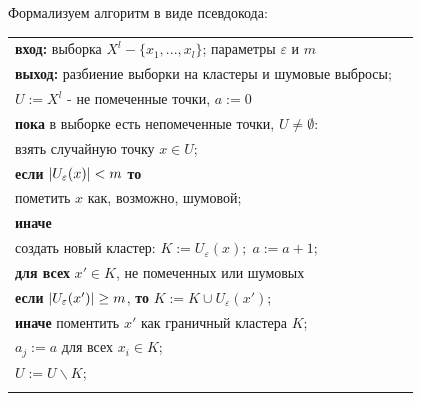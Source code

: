 Формализуем алгоритм в виде псевдокода:\\
\begin{tabularx}{\linewidth}{lX}
\textbf{вход:} выборка $X^l - \{x_1,...,x_l\}$; параметры $\varepsilon$ и $m$\\
\textbf{выход:} разбиение выборки на кластеры и шумовые выбросы;\\\hspace*{7mm}\hspace*{9mm}$U := X^l$ - не помеченные точки, $a := 0$\\
\textbf{пока} в выборке есть непомеченные точки, $U \neq \emptyset$:\\
\hspace*{7mm} взять случайную точку $x \in U$; \\
\hspace*{7mm} \textbf{если} $\left|U_\varepsilon (x)\right| < m$ \textbf{то} \\
\hspace*{7mm}\hspace*{7mm} пометить $x$ как, возможно, шумовой;\\
\hspace*{7mm}\textbf{иначе} \\
\hspace*{7mm}\hspace*{7mm} создать новый кластер: $K:=U_\varepsilon (x); \; a:=a+1;$ \\
\hspace*{7mm}\hspace*{7mm} \textbf{для всех} $x' \in K$, не помеченных или шумовых \\
\hspace*{7mm}\hspace*{7mm}\hspace*{7mm} \textbf{если} $\left|U_\varepsilon (x')\right| \geq m$,  \textbf{то} $K := K \cup U_\varepsilon (x')$; \\
\hspace*{7mm}\hspace*{7mm}\hspace*{7mm} \textbf{иначе} поментить $x'$ как граничный кластера $K$;\\
\hspace*{7mm}\hspace*{7mm} $a_j := a$ для всех $x_i \in K$;\\
\hspace*{7mm}\hspace*{7mm} $U := U \backslash K$;\\
\vspace{5mm}
\end{tabularx}

